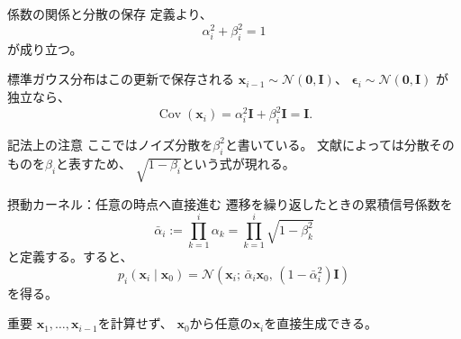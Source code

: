 \begin{frame}{係数の関係と分散の保存}
    定義より、
    \[
        \boxed{\alpha_i^2+\beta_i^2=1}
    \]
    が成り立つ。
    \begin{block}{標準ガウス分布はこの更新で保存される}
        $\boldsymbol{x}_{i-1}\sim\mathcal{N}(\boldsymbol{0},\boldsymbol{I})$、
        $\boldsymbol{\epsilon}_i\sim\mathcal{N}(\boldsymbol{0},\boldsymbol{I})$
        が独立なら、
        \[
            \operatorname{Cov}(\boldsymbol{x}_i)
            =
            \alpha_i^2\boldsymbol{I}
            +
            \beta_i^2\boldsymbol{I}
            =
            \boldsymbol{I}.
        \]
    \end{block}
    \begin{alertblock}{記法上の注意}
        ここではノイズ分散を$\beta_i^2$と書いている。
        文献によっては分散そのものを$\beta_i$と表すため、
        $\sqrt{1-\beta_i}$という式が現れる。
    \end{alertblock}
\end{frame}
\begin{frame}{摂動カーネル：任意の時点へ直接進む}
    遷移を繰り返したときの累積信号係数を
    \[
        \bar{\alpha}_i
        :=
        \prod_{k=1}^{i}\alpha_k
        =
        \prod_{k=1}^{i}\sqrt{1-\beta_k^2}
    \]
    と定義する。すると、
    \[
        \boxed{
        p_i(\boldsymbol{x}_i\mid\boldsymbol{x}_0)
        =
        \mathcal{N}\!\left(
        \boldsymbol{x}_i;\,
        \bar{\alpha}_i\boldsymbol{x}_0,\,
        (1-\bar{\alpha}_i^2)\boldsymbol{I}
        \right)
        }
    \]
    を得る。
    \begin{block}{重要}
        $\boldsymbol{x}_1,\ldots,\boldsymbol{x}_{i-1}$を計算せず、
        $\boldsymbol{x}_0$から任意の$\boldsymbol{x}_i$を直接生成できる。
    \end{block}
\end{frame}
